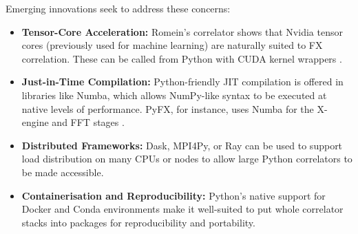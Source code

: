     Emerging innovations seek to address these concerns:

    \begin{itemize}
        \item \textbf{Tensor-Core Acceleration:} Romein's correlator shows that Nvidia tensor cores (previously used for machine learning) are naturally suited to FX correlation. These can be called from Python with CUDA kernel wrappers \cite{Romein2021}.
        
        \item \textbf{Just-in-Time Compilation:} Python-friendly JIT compilation is offered in libraries like Numba, which allows NumPy-like syntax to be executed at native levels of performance. PyFX, for instance, uses Numba for the X-engine and FFT stages \cite{Leung2024}.
        
        \item \textbf{Distributed Frameworks:} Dask, MPI4Py, or Ray can be used to support load distribution on many CPUs or nodes to allow large Python correlators to be made accessible.
        
        \item \textbf{Containerisation and Reproducibility:} Python's native support for Docker and Conda environments make it well-suited to put whole correlator stacks into packages for reproducibility and portability.
    \end{itemize}